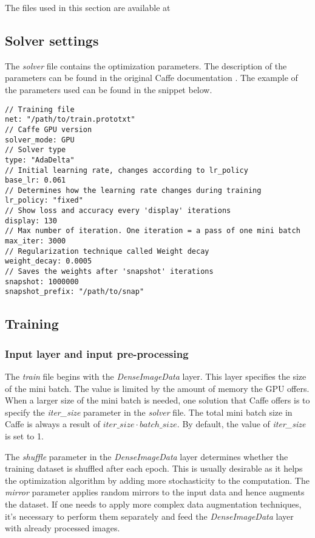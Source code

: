 The files used in this section are available at \cite{filip_github}

\subsection{Solver settings}

The \textit{solver} file contains the optimization parameters. The description of the parameters can be found in the original Caffe documentation \cite{caffe}. The example of the parameters used can be found in the snippet below. 

\begin{lstlisting}[caption={Contents of \textit{solver.prototxt}},captionpos=b]
// Training file
net: "/path/to/train.prototxt"	
// Caffe GPU version
solver_mode: GPU
// Solver type		
type: "AdaDelta"
// Initial learning rate, changes according to lr_policy		
base_lr: 0.061		
// Determines how the learning rate changes during training
lr_policy: "fixed"	
// Show loss and accuracy every 'display' iterations
display: 130
// Max number of iteration. One iteration = a pass of one mini batch			
max_iter: 3000	
// Regularization technique called Weight decay		
weight_decay: 0.0005
// Saves the weights after 'snapshot' iterations
snapshot: 1000000		
snapshot_prefix: "/path/to/snap" 
\end{lstlisting}

\subsection{Training}

\subsubsection{Input layer and input pre-processing}

The \textit{train} file begins with the \textit{DenseImageData} layer. This layer specifies the size of the mini batch. The value is limited by the amount of memory the GPU offers. When a larger size of the mini batch is needed, one solution that Caffe offers is to specify the \textit{iter\_size} parameter in the \textit{solver} file. The total mini batch size in Caffe is always a result of $iter\_size \cdot batch\_size$. By default, the value of \textit{iter\_size} is set to 1.

The \textit{shuffle} parameter in the \textit{DenseImageData} layer determines whether the training dataset is shuffled after each epoch. This is usually desirable as it helps the optimization algorithm by adding more stochasticity to the computation. The \textit{mirror} parameter applies random mirrors to the input data and hence augments the dataset. If one needs to apply more complex data augmentation techniques, it's necessary to perform them separately and feed the \textit{DenseImageData} layer with already processed images.

